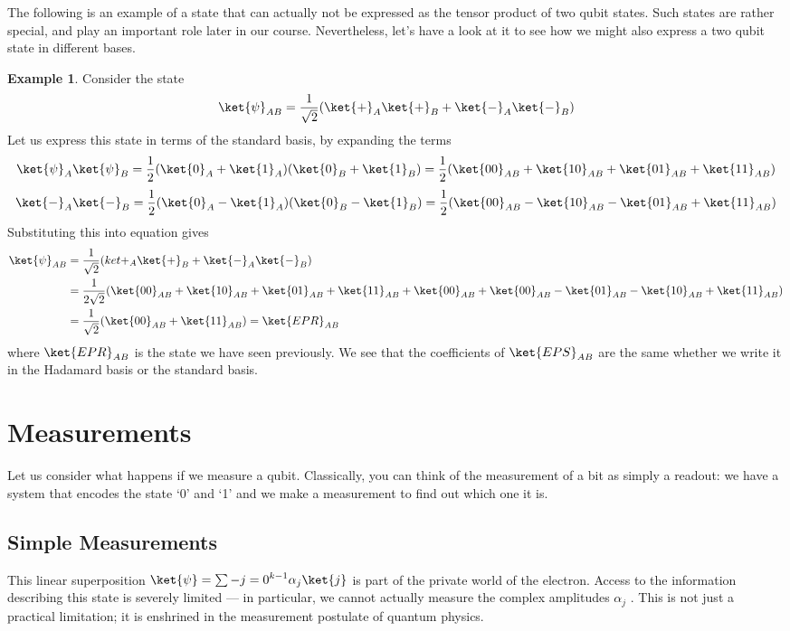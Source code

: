 \documentclass[12pt, oneside]{book}
\theoremstyle{definition}
\theoremstyle{definition}
\newtheorem{example}{Example}[section]
\theoremstyle{remark}
\begin{document}
The following is an example of a state that can actually not be expressed as the tensor product
of two qubit states. Such states are rather special, and play an important role later in our course.
Nevertheless, let’s have a look at it to see how we might also express a two qubit state in different
bases.
\begin{example}
    Consider the state
    \[
    \ket{\psi}_{AB}=\frac{1}{\sqrt{2}}(\ket{+}_A\ket{+}_B+\ket{-}_A\ket{-}_B)
    \]
    Let us express this state in terms of the standard basis, by expanding the terms
    \[
    \ket{\psi}_A\ket{\psi}_B=\frac{1}{2}(\ket{0}_A+\ket{1}_A)(\ket{0}_B+\ket{1}_B)=\frac{1}{2}(\ket{00}_{AB}+\ket{10}_{AB}+\ket{01}_{AB}+\ket{11}_{AB})
    \]
    \[
    \ket{-}_A\ket{-}_B=\frac{1}{2}(\ket{0}_A-\ket{1}_A)(\ket{0}_B-\ket{1}_B)=\frac{1}{2}(\ket{00}_{AB}-\ket{10}_{AB}-\ket{01}_{AB}+\ket{11}_{AB})
    \]
    Substituting this into equation gives
    \begin{align*}
    \ket{\psi}_{AB}&=\frac{1}{\sqrt{2}}(ket{+}_A\ket{+}_B+\ket{-}_A\ket{-}_B)\\
    &=\frac{1}{2\sqrt{2}}(\ket{00}_{AB}+\ket{10}_{AB}+\ket{01}_{AB}+\ket{11}_{AB}+\ket{00}_{AB}+\ket{00}_{AB}-\ket{01}_{AB}-\ket{10}_{AB}+\ket{11}_{AB})\\
    &=\frac{1}{\sqrt{2}}(\ket{00}_{AB}+\ket{11}_{AB})=\ket{EPR}_{AB}
    \end{align*}
    where $\ket{EPR}_{AB}$ is the state we have seen previously. We see that the coefficients of $\ket{EPS}_{AB}$ are the same whether we write it in the Hadamard basis or the standard basis.
\end{example}



\section{Measurements}
Let us consider what happens if we measure a qubit. Classically, you can think of the measurement
of a bit as simply a readout: we have a system that encodes the state ‘0’ and ‘1’ and we make a
measurement to find out which one it is.
\subsection{Simple Measurements}
This linear superposition $\ket{\psi}=\sum-{j=0}^{k-1}\alpha_j\ket{j}$ is part of the private world of the
electron. Access to the information describing this state is severely limited —
in particular, we cannot actually measure the complex amplitudes $\alpha_j$ . This is
not just a practical limitation; it is enshrined in the measurement postulate
of quantum physics.
\end{document}

